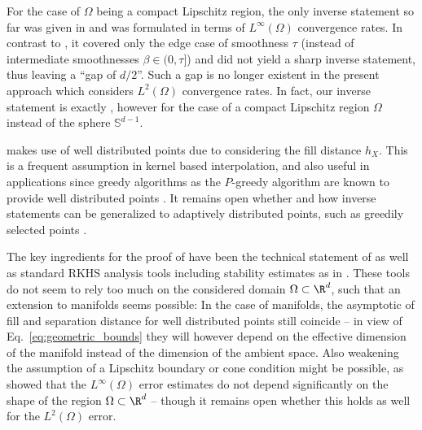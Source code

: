 \documentclass[a4paper, 10pt]{article}
\begin{document}
For the case of $\Omega$ being a compact Lipschitz region, 
the only inverse statement so far was given in \cite{schaback2002inverse} and was formulated in terms of $L^\infty(\Omega)$ convergence rates.
In contrast to , 
it covered only the edge case of smoothness $\tau$ (instead of intermediate smoothnesses $\beta \in (0, \tau]$) and did not yield a sharp inverse statement, thus leaving a ``gap of $d/2$''.
Such a gap is no longer existent in the present approach which considers $L^2(\Omega)$ convergence rates.
In fact, our inverse statement  is exactly \cite[Theorem 6.2]{narcowich2007direct},
however for the case of a compact Lipschitz region $\Omega$ instead of the sphere $\mathbb{S}^{d-1}$. 

 makes use of well distributed points due to considering the fill distance $h_{X}$.
This is a frequent assumption in kernel based interpolation, 
and also useful in applications since greedy algorithms as the $P$-greedy algorithm are known to provide well distributed points \cite[Theorem 19 \& 20]{wenzel2021novel}.
It remains open whether and how inverse statements can be generalized to adaptively distributed points, 
such as greedily selected points \cite{wenzel2023analysis, santin2024optimality}.

The key ingredients for the proof of  have been the technical statement of  as well as standard RKHS analysis tools including stability estimates as in .
These tools do not seem to rely too much on the considered domain $\Omega \subset \R^d$, such that an extension to manifolds seems possible: 
In the case of manifolds, the asymptotic of fill and separation distance for well distributed points still coincide 
-- in view of Eq.~\eqref{eq:geometric_bounds} they will however depend on the effective dimension of the manifold instead of the dimension of the ambient space.
%
Also weakening the assumption of a Lipschitz boundary or cone condition might be possible, 
as \cite{wenzel2024stability} showed that the $L^\infty(\Omega)$ error estimates do not depend significantly on the shape of the region $\Omega \subset \R^d$ 
-- though it remains open whether this holds as well for the $L^2(\Omega)$ error.

%
%
%
%
%
%
%
%
%
%
%
%
%
%
\end{document}
